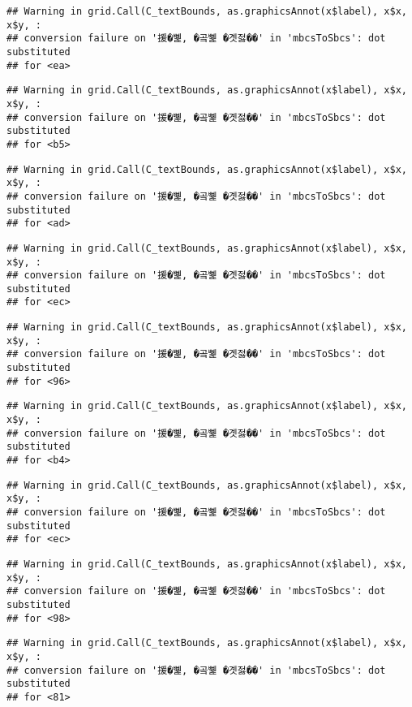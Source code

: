 \documentclass[
]{article}
\begin{document}
\begin{verbatim}
## Warning in grid.Call(C_textBounds, as.graphicsAnnot(x$label), x$x, x$y, :
## conversion failure on '援�뼱, �곸뼱 �곗젏��' in 'mbcsToSbcs': dot substituted
## for <ea>
\end{verbatim}

\begin{verbatim}
## Warning in grid.Call(C_textBounds, as.graphicsAnnot(x$label), x$x, x$y, :
## conversion failure on '援�뼱, �곸뼱 �곗젏��' in 'mbcsToSbcs': dot substituted
## for <b5>
\end{verbatim}

\begin{verbatim}
## Warning in grid.Call(C_textBounds, as.graphicsAnnot(x$label), x$x, x$y, :
## conversion failure on '援�뼱, �곸뼱 �곗젏��' in 'mbcsToSbcs': dot substituted
## for <ad>
\end{verbatim}

\begin{verbatim}
## Warning in grid.Call(C_textBounds, as.graphicsAnnot(x$label), x$x, x$y, :
## conversion failure on '援�뼱, �곸뼱 �곗젏��' in 'mbcsToSbcs': dot substituted
## for <ec>
\end{verbatim}

\begin{verbatim}
## Warning in grid.Call(C_textBounds, as.graphicsAnnot(x$label), x$x, x$y, :
## conversion failure on '援�뼱, �곸뼱 �곗젏��' in 'mbcsToSbcs': dot substituted
## for <96>
\end{verbatim}

\begin{verbatim}
## Warning in grid.Call(C_textBounds, as.graphicsAnnot(x$label), x$x, x$y, :
## conversion failure on '援�뼱, �곸뼱 �곗젏��' in 'mbcsToSbcs': dot substituted
## for <b4>
\end{verbatim}

\begin{verbatim}
## Warning in grid.Call(C_textBounds, as.graphicsAnnot(x$label), x$x, x$y, :
## conversion failure on '援�뼱, �곸뼱 �곗젏��' in 'mbcsToSbcs': dot substituted
## for <ec>
\end{verbatim}

\begin{verbatim}
## Warning in grid.Call(C_textBounds, as.graphicsAnnot(x$label), x$x, x$y, :
## conversion failure on '援�뼱, �곸뼱 �곗젏��' in 'mbcsToSbcs': dot substituted
## for <98>
\end{verbatim}

\begin{verbatim}
## Warning in grid.Call(C_textBounds, as.graphicsAnnot(x$label), x$x, x$y, :
## conversion failure on '援�뼱, �곸뼱 �곗젏��' in 'mbcsToSbcs': dot substituted
## for <81>
\end{verbatim}
\end{document}
